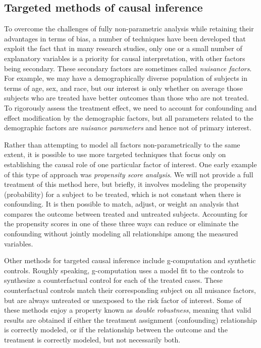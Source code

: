 \subsection{Targeted methods of causal inference}

To overcome the challenges of fully non-parametric analysis while retaining their advantages in terms of bias, a number of techniques have been developed that exploit the fact that in many research studies, only one or a small number of explanatory variables is a priority for causal interpretation, with other factors being secondary.  These secondary factors are sometimes called {\em nuisance factors}.  For example, we may have a demographically diverse population of subjects in terms of age, sex, and race, but our interest is only whether on average those subjects who are treated have better outcomes than those who are not treated.  To rigorously assess the treatment effect, we need to account for confounding and effect modification by the demographic factors, but all parameters related to the demographic factors are {\em nuisance parameters} and hence not of primary interest.

Rather than attempting to model all factors non-parametrically to the same extent, it is possible to use more targeted techniques that focus only on establishing the causal role of one particular factor of interest.  One early example of this type of approach was {\em propensity score analysis}.  We will not provide a full treatment of this method here, but briefly, it involves modeling the propensity (probability) for a subject to be treated, which is not constant when there is confounding.  It is then possible to match, adjust, or weight an analysis that compares the outcome between treated and untreated subjects.  Accounting for the propensity scores in one of these three ways can reduce or eliminate the confounding without jointly modeling all relationships among the measured variables.

Other methods for targeted causal inference include g-computation and synthetic controls.  Roughly speaking, g-computation uses a model fit to the controls to synthesize a counterfactual control for each of the treated cases.  These counterfactual controls match their corresponding subject on all nuisance factors, but are always untreated or unexposed to the risk factor of interest.  Some of these methods enjoy a property known as {\em double robustness}, meaning that valid results are obtained if either the treatment assignment (confounding) relationship is correctly modeled, or if the relationship between the outcome and the treatment is correctly modeled, but not necessarily both.

